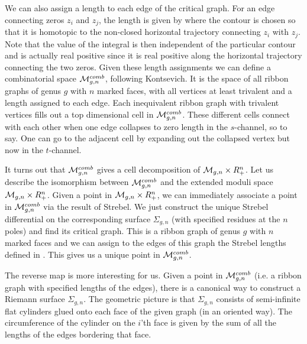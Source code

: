 We can also assign a length to each edge of the critical graph. For an edge
connecting zeros $z_i$ and $z_j$, the length is given by 
\eqn{}
where the contour is chosen so that it is homotopic to the non-closed 
horizontal trajectory connecting $z_i$ with $z_j$. 
Note that the value of the integral is then 
independent of the particular contour and is actually real positive 
since it is real positive along the horizontal trajectory connecting the
two zeros. Given these length assignments we can define a combinatorial
space ${\cal M}_{g,n}^{comb}$, following Kontsevich. It is the space of all
ribbon graphs of genus $g$ with $n$ marked faces, with all vertices at least 
trivalent and a length assigned to each edge. Each inequivalent 
ribbon graph with trivalent vertices fills out a top dimensional cell
in ${\cal M}_{g,n}^{comb}$. These different cells  
connect with each other when one edge collapses to zero length in the 
$s$-channel, so to say. One can go to the adjacent cell
by expanding out the collapsed vertex but
now in the $t$-channel.  

It turns out that ${\cal M}_{g,n}^{comb}$ gives a cell
decomposition of ${\cal M}_{g,n}\times R_+^n$.
Let us describe the isomorphism between ${\cal M}_{g,n}^{comb}$
and the extended moduli space ${\cal M}_{g,n}\times R_+^n$.
Given a point in ${\cal M}_{g,n}\times R_+^n$, we can immediately 
associate a point in ${\cal M}_{g,n}^{comb}$ via the result of Strebel.
We just construct the unique Strebel differential on the corresponding 
surface $\Sigma_{g,n}$ (with specified residues at the $n$ poles) and 
find its critical graph. This is a ribbon graph of genus $g$ with $n$ 
marked faces and we can assign to the edges of this graph the Strebel 
lengths defined in \strl . This gives us a unique point in 
${\cal M}_{g,n}^{comb}$.

The reverse map is more interesting for us. Given a point 
in ${\cal M}_{g,n}^{comb}$ (i.e. a ribbon graph 
with specified lengths of the edges), there is a canonical way to construct a 
Riemann surface $\Sigma_{g,n}$. 
The geometric picture is that $\Sigma_{g,n}$ consists 
of semi-infinite flat cylinders glued  
onto each face of the given graph (in an oriented way). The circumference
of the cylinder on the $i$'th face is given by 
the sum of all the lengths of the edges bordering that face.  


